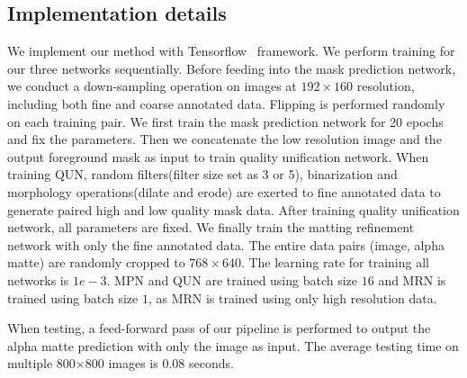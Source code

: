 \documentclass[10pt,twocolumn,letterpaper]{article}
\begin{document}
\subsection{Implementation details}

We implement our method with Tensorflow~\cite{abadi2016tensorflow} framework. We perform training for our three networks sequentially. Before feeding into the mask prediction network, we conduct a down-sampling operation on images at $192\times160$ resolution, including both fine and coarse annotated data. Flipping is performed randomly on each training pair. We first train the mask prediction network for 20 epochs and fix the parameters. Then we concatenate the low resolution image and the output foreground mask as input to train quality unification network. When training QUN, random filters(filter size set as 3 or 5), binarization and morphology operations(dilate and erode) are exerted to fine annotated data to generate paired high and low quality mask data. After training quality unification network, all parameters are fixed. We finally train the matting refinement network with only the fine annotated data. The entire data pairs (image, alpha matte) are randomly cropped to $768\times640$. The learning rate for training all networks is $1e-3$. MPN and QUN are trained using batch size $16$ and MRN is trained using batch size $1$, as MRN is trained using only high resolution data.

When testing, a feed-forward pass of our pipeline is performed to output the alpha matte prediction with only the image as input. The average testing time on multiple 800$\times$800 images is 0.08 seconds.

\begin{table}[t]
  \centering\scriptsize
    \caption{The configurations of human matting datasets.}
  \label{tab:dataset}
\end{table}
\end{document}
